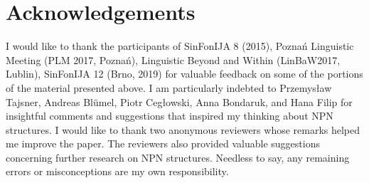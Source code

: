 \documentclass[output=paper]{langscibook}
\begin{document}
\section*{Acknowledgements}

I would like to thank the participants of SinFonIJA 8 (2015), Poznań Linguistic Meeting (PLM 2017, Poznań), Linguistic Beyond and Within (LinBaW2017, Lublin), SinFonIJA 12 (Brno, 2019) for valuable feedback on some of the portions of the material presented above. I am particularly indebted to Przemysław Tajsner, Andreas Blümel, Piotr Cegłowski, Anna Bondaruk, and Hana Filip for insightful comments and suggestions that inspired my thinking about NPN structures. I would like to thank two anonymous reviewers whose remarks helped me improve the paper. The reviewers also provided valuable suggestions concerning further research on NPN structures. Needless to say, any remaining errors or misconceptions are my own responsibility.

{\sloppy\printbibliography[heading=subbibliography,notkeyword=this]}
\end{document}
